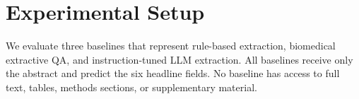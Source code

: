 \documentclass{article}
\newcommand{\NR}{\texttt{NOT\_REPORTED}}
\begin{document}
\section{Experimental Setup}
\label{sec:experimental_setup}

We evaluate three baselines that represent rule-based extraction, biomedical extractive QA, and instruction-tuned LLM extraction. All baselines receive only the abstract and predict the six headline fields. No baseline has access to full text, tables, methods sections, or supplementary material.



\end{document}
